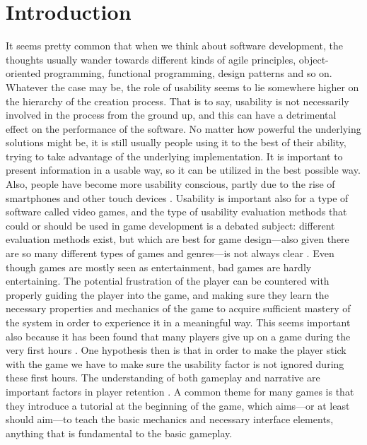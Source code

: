 \chapter{Introduction}
It seems pretty common that when we think about software development, the thoughts usually wander towards different kinds of agile principles, object-oriented programming, functional programming, design patterns and so on. Whatever the case may be, the role of usability seems to lie somewhere higher on the hierarchy of the creation process. That is to say, usability is not necessarily involved in the process from the ground up, and this can have a detrimental effect on the performance of the software. No matter how powerful the underlying solutions might be, it is still usually people using it to the best of their ability, trying to take advantage of the underlying implementation. It is important to present information in a usable way, so it can be utilized in the best possible way. Also, people have become more usability conscious, partly due to the rise of smartphones and other touch devices \cite{Chen2015}. Usability is important also for a type of software called video games, and the type of usability evaluation methods that could or should be used in game development is a debated subject: different evaluation methods exist, but which are best for game design---also given there are so many different types of games and genres---is not always clear \cite{Bernhaupt2007}. Even though games are mostly seen as entertainment, bad games are hardly entertaining. The potential frustration of the player can be countered with properly guiding the player into the game, and making sure they learn the necessary properties and mechanics of the game to acquire sufficient mastery of the system in order to experience it in a meaningful way. This seems important also because it has been found that many players give up on a game during the very first hours \cite{Bauckhage2012}. One hypothesis then is that in order to make the player stick with the game we have to make sure the usability factor is not ignored during these first hours. The understanding of both gameplay and narrative are important factors in player retention \cite{Cheung2014}. A common theme for many games is that they introduce a tutorial at the beginning of the game, which aims---or at least should aim---to teach the basic mechanics and necessary interface elements, anything that is fundamental to the basic gameplay. 

